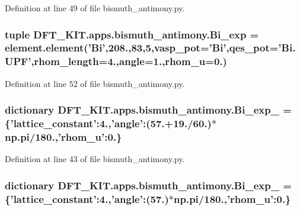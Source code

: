 Definition at line 49 of file bismuth\+\_\+antimony.\+py.

\hypertarget{namespace_d_f_t___k_i_t_1_1apps_1_1bismuth__antimony_a47d28bdcd6f82edb8765d6a4ca9654f7}{
\subsubsection[{Bi\+\_\+exp}]{\setlength{\rightskip}{0pt plus 5cm}tuple D\+F\+T\+\_\+\+K\+I\+T.\+apps.\+bismuth\+\_\+antimony.\+Bi\+\_\+exp = element.\+element('Bi',208.,83,5,vasp\+\_\+pot='Bi',qes\+\_\+pot='Bi.\+U\+P\+F',rhom\+\_\+length=4.,angle=1.,rhom\+\_\+u=0.)}}\label{namespace_d_f_t___k_i_t_1_1apps_1_1bismuth__antimony_a47d28bdcd6f82edb8765d6a4ca9654f7}


Definition at line 52 of file bismuth\+\_\+antimony.\+py.

\hypertarget{namespace_d_f_t___k_i_t_1_1apps_1_1bismuth__antimony_a3897eb47b9a6eba72bc4280a6b6d41fd}{
\subsubsection[{Bi\+\_\+exp\+\_\+1}]{\setlength{\rightskip}{0pt plus 5cm}dictionary D\+F\+T\+\_\+\+K\+I\+T.\+apps.\+bismuth\+\_\+antimony.\+Bi\+\_\+exp\+\_ = \{'lattice\+\_\+constant'\+:4.,'angle'\+:(57.+19./60.)$\ast$np.\+pi/180.,'rhom\+\_\+u'\+:0.\}}}\label{namespace_d_f_t___k_i_t_1_1apps_1_1bismuth__antimony_a3897eb47b9a6eba72bc4280a6b6d41fd}


Definition at line 43 of file bismuth\+\_\+antimony.\+py.

\hypertarget{namespace_d_f_t___k_i_t_1_1apps_1_1bismuth__antimony_a2fc8afe0ae0f1828d58e0a064cd3a844}{
\subsubsection[{Bi\+\_\+exp\+\_\+2}]{\setlength{\rightskip}{0pt plus 5cm}dictionary D\+F\+T\+\_\+\+K\+I\+T.\+apps.\+bismuth\+\_\+antimony.\+Bi\+\_\+exp\+\_ = \{'lattice\+\_\+constant'\+:4.,'angle'\+:(57.)$\ast$np.\+pi/180.,'rhom\+\_\+u'\+:0.\}}}\label{namespace_d_f_t___k_i_t_1_1apps_1_1bismuth__antimony_a2fc8afe0ae0f1828d58e0a064cd3a844}


